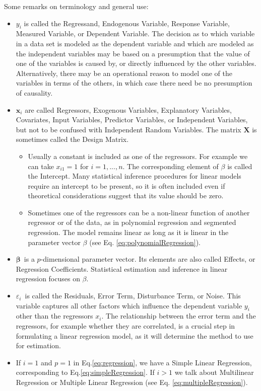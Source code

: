 Some remarks on terminology and general use:
\begin{itemize}     
  \item $y_i$  is called the Regressand, Endogenous Variable, Response Variable, Measured Variable, or Dependent Variable.  The decision as to which variable in a data set is modeled as the dependent variable and which are modeled as the independent variables may be based on a presumption that the value of one of the variables is caused by, or directly influenced by the other variables. Alternatively, there may be an operational reason to model one of the variables in terms of the others, in which case there need be no presumption of causality.
  \item $\mathbf{x}_i$ are called Regressors, Exogenous Variables, Explanatory Variables, Covariates, Input Variables, Predictor Variables, or Independent Variables, but not to be confused with Independent Random Variables. The matrix $\mathbf{X}$ is sometimes called the Design Matrix.
      \begin{itemize}
        \item Usually a constant is included as one of the regressors. For example we can take $x_{i1}=1$ for $i=1,...,n$. The corresponding element of $\beta$ is called the Intercept. Many statistical inference procedures for linear models require an intercept to be present, so it is often included even if theoretical considerations suggest that its value should be zero.
        \item Sometimes one of the regressors can be a non-linear function of another regressor or of the data, as in polynomial regression and segmented regression. The model remains linear as long as it is linear in the parameter vector $\beta$ (see Eq. \ref{eq:polynomialRegression}).
         \end{itemize}
  \item $\boldsymbol\beta\,$ is a $p$-dimensional parameter vector. Its elements are also called Effects, or Regression Coefficients. Statistical estimation and inference in linear regression focuses on $\beta$.
  \item $\varepsilon_i\,$ is called the Residuals, Error Term, Disturbance Term, or Noise. This variable captures all other factors which influence the dependent variable $y_i$ other than the regressors $x_i$. The relationship between the error term and the regressors, for example whether they are correlated, is a crucial step in formulating a linear regression model, as it will determine the method to use for estimation.
  \item If $i=1$ and $p=1$ in Eq.\ref{eq:regression}, we have a Simple Linear Regression, corresponding to Eq.\ref{eq:simpleRegression}. If $i>1$ we talk about Multilinear Regression or Multiple Linear Regression (see Eq. \ref{eq:multipleRegression}).

\end{itemize}

